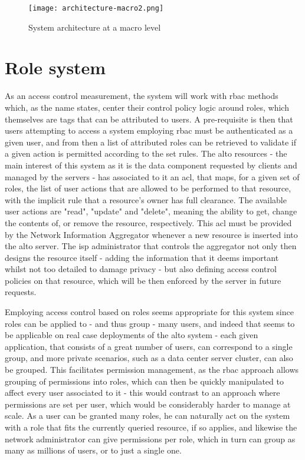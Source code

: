 
\begin{figure}[H]
        \centering
        \texttt{[image: architecture-macro2.png]}
        \caption{System architecture at a macro level}
        \label{fig:macro-architecture}
\end{figure}

\section{Role system}
\label{sec:system-roles}

    As an access control measurement, the system will work with \gls{rbac} methods which, as the name states, center their control policy logic around roles, which themselves are tags that can be attributed to users.
    A pre-requisite is then that users attempting to access a system employing \gls{rbac} must be authenticated as a given user, and from then a list of attributed roles can be retrieved to validate if a given action is permitted according to the set rules.
    The \gls{alto} resources - the main interest of this system as it is the data component requested by clients and managed by the servers - has associated to it an \gls{acl}, that maps, for a given set of roles, the list of user actions that are allowed to be performed to that resource, with the implicit rule that a resource's owner has full clearance.
    The available user actions are "read", "update" and "delete", meaning the ability to get, change the contents of, or remove the resource, respectively.
    This \gls{acl} must be provided by the Network Information Aggregator whenever a new resource is inserted into the \gls{alto} server.
    The \gls{isp} administrator that controls the aggregator not only then designs the resource itself - adding the information that it deems important whilst not too detailed to damage privacy - but also defining access control policies on that resource, which will be then enforced by the server in future requests.

    Employing access control based on roles seems appropriate for this system since roles can be applied to - and thus group - many users, and indeed that seems to be applicable on real case deployments of the \gls{alto} system - each given application, that consists of a great number of users, can correspond to a single group, and more private scenarios, such as a data center server cluster, can also be grouped.
    This facilitates permission management, as the \gls{rbac} approach allows grouping of permissions into roles, which can then be quickly manipulated to affect every user associated to it - this would contrast to an approach where permissions are set per user, which would be considerably harder to manage at scale.
    As a user can be granted many roles, he can naturally act on the system with a role that fits the currently queried resource, if so applies, and likewise the network administrator can give permissions per role, which in turn can group as many as millions of users, or to just a single one.

